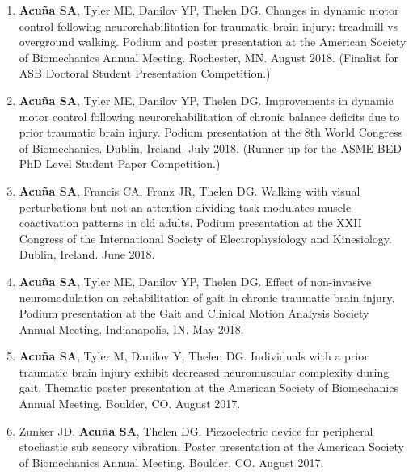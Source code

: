 \documentclass[letterpaper, 10pt]{article}
\begin{document}
\begin{enumerate}
    \item \textbf{Acuña SA}, Tyler ME, Danilov YP, Thelen DG. Changes in dynamic motor control following neurorehabilitation for traumatic brain injury: treadmill vs overground walking. Podium and poster presentation at the American Society of Biomechanics Annual Meeting. Rochester, MN. August 2018. (Finalist for ASB Doctoral Student Presentation Competition.)
    \item \textbf{Acuña SA}, Tyler ME, Danilov YP, Thelen DG. Improvements in dynamic motor control following neurorehabilitation of chronic balance deﬁcits due to prior traumatic brain injury. Podium presentation at the 8th World Congress of Biomechanics. Dublin, Ireland. July 2018. (Runner up for the ASME-BED PhD Level Student Paper Competition.)
    \item \textbf{Acuña SA}, Francis CA, Franz JR, Thelen DG. Walking with visual perturbations but not an attention-dividing task modulates muscle coactivation patterns in old adults. Podium presentation at the XXII Congress of the International Society of Electrophysiology and Kinesiology. Dublin, Ireland. June 2018.
    \item \textbf{Acuña SA}, Tyler ME, Danilov YP, Thelen DG. Effect of non-invasive neuromodulation on rehabilitation of gait in chronic traumatic brain injury. Podium presentation at the Gait and Clinical Motion Analysis Society Annual Meeting. Indianapolis, IN. May 2018.
    \item \textbf{Acuña SA}, Tyler M, Danilov Y, Thelen DG. Individuals with a prior traumatic brain injury exhibit decreased neuromuscular complexity during gait. Thematic poster presentation at the American Society of Biomechanics Annual Meeting. Boulder, CO. August 2017.
    \item Zunker JD, \textbf{Acuña SA}, Thelen DG. Piezoelectric device for peripheral stochastic sub sensory vibration. Poster presentation at the American Society of Biomechanics Annual Meeting. Boulder, CO. August 2017.

\end{enumerate}
\end{document}
